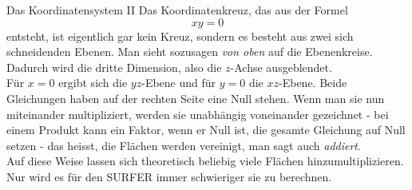 \begin{surferPage}[Koordinaten II]{Das Koordinatensystem II}
Das Koordinatenkreuz, das aus der Formel 
\[xy=0\]
entsteht, ist eigentlich gar kein Kreuz, sondern es besteht aus zwei sich schneidenden Ebenen. Man sieht sozusagen {\it von oben} auf die Ebenenkreise. Dadurch wird die dritte Dimension, also die $z$-Achse ausgeblendet.  \\
\vspace{0,3cm}
Für $x=0$ ergibt sich die $yz$-Ebene und für $y=0$ die $xz$-Ebene. 
Beide Gleichungen haben auf der rechten Seite eine Null stehen. Wenn man sie nun miteinander multipliziert, werden sie unabhängig voneinander gezeichnet - bei einem Produkt kann ein Faktor, wenn er Null ist, die gesamte Gleichung auf Null setzen - das heisst, die Flächen werden vereinigt, man sagt auch {\it addiert}. \\
Auf diese Weise lassen sich theoretisch beliebig viele Flächen hinzumultiplizieren. Nur wird es für den SURFER immer schwieriger sie zu berechnen.
\end{surferPage}
